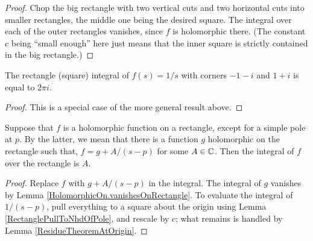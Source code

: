 \begin{proof}\leanok
Chop the big rectangle with two vertical cuts and two horizontal cuts into smaller rectangles,
the middle one being the desired square. The integral over each of the outer rectangles
vanishes, since $f$ is holomorphic there. (The constant $c$ being ``small enough'' here just means
that the inner square is strictly contained in the big rectangle.)

\end{proof}


\begin{lemma}[ResidueTheoremAtOrigin]\label{ResidueTheoremAtOrigin}
\leanok
The rectangle (square) integral of $f(s) = 1/s$ with corners $-1-i$ and $1+i$ is equal to $2\pi i$.
\end{lemma}


\begin{proof}\leanok
This is a special case of the more general result above.
\end{proof}


\begin{lemma}[ResidueTheoremOnRectangleWithSimplePole]\label{ResidueTheoremOnRectangleWithSimplePole}
\leanok
Suppose that $f$ is a holomorphic function on a rectangle, except for a simple pole
at $p$. By the latter, we mean that there is a function $g$ holomorphic on the rectangle such that, $f = g + A/(s-p)$ for some $A\in\C$. Then the integral of $f$ over the
rectangle is $A$.
\end{lemma}


\begin{proof}
\leanok
Replace $f$ with $g + A/(s-p)$ in the integral.
The integral of $g$ vanishes by Lemma \ref{HolomorphicOn.vanishesOnRectangle}.
 To evaluate the integral of $1/(s-p)$,
pull everything to a square about the origin using Lemma \ref{RectanglePullToNhdOfPole},
and rescale by $c$;
what remains is handled by Lemma \ref{ResidueTheoremAtOrigin}.
\end{proof}

